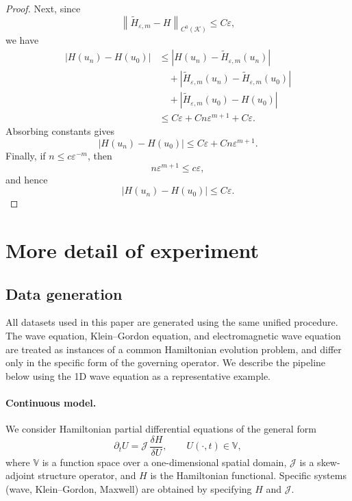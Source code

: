 \documentclass{article}
\theoremstyle{plain}
\theoremstyle{definition}
\theoremstyle{remark}
\newcommand{\norm}[1]{\left\lVert #1\right\rVert}
\newcommand{\abs}[1]{\left\lvert #1\right\rvert}
\begin{document}
\begin{proof}
Next, since
\[
    \norm{\widetilde H_{\varepsilon,m}-H}_{C^0(\mathcal{K})}\leq C\varepsilon,
\]
we have
\[
\begin{aligned}
    \abs{H(u_n)-H(u_0)}
    &\leq
    \abs{H(u_n)-\widetilde H_{\varepsilon,m}(u_n)} \\
    &\quad+
    \abs{\widetilde H_{\varepsilon,m}(u_n)-\widetilde H_{\varepsilon,m}(u_0)} \\
    &\quad+
    \abs{\widetilde H_{\varepsilon,m}(u_0)-H(u_0)} \\
    &\leq C\varepsilon+Cn\varepsilon^{m+1}+C\varepsilon.
\end{aligned}
\]
Absorbing constants gives
\[
    \abs{H(u_n)-H(u_0)}
    \leq C\varepsilon+Cn\varepsilon^{m+1}.
\]
Finally, if \(n\leq c\varepsilon^{-m}\), then
\[
    n\varepsilon^{m+1}\leq c\varepsilon,
\]
and hence
\[
    \abs{H(u_n)-H(u_0)}\leq C\varepsilon.
\]
\end{proof}

\section{More detail of experiment}
\label{Exper}

\subsection{Data generation}
All datasets used in this paper are generated using the same unified procedure.
The wave equation, Klein--Gordon equation, and electromagnetic wave equation
are treated as instances of a common Hamiltonian evolution problem, and differ
only in the specific form of the governing operator.
We describe the pipeline below using the 1D wave equation as a representative example.

\paragraph{Continuous model.}
We consider Hamiltonian partial differential equations of the general form
\begin{equation}
\partial_t U = \mathcal{J}\,\frac{\delta H}{\delta U},
\qquad
U(\cdot,t)\in\mathbb{V},
\end{equation}
where $\mathbb{V}$ is a function space over a one-dimensional spatial domain,
$\mathcal{J}$ is a skew-adjoint structure operator, and $H$ is the Hamiltonian
functional.
Specific systems (wave, Klein--Gordon, Maxwell) are obtained by specifying
$H$ and $\mathcal{J}$.
\end{document}

